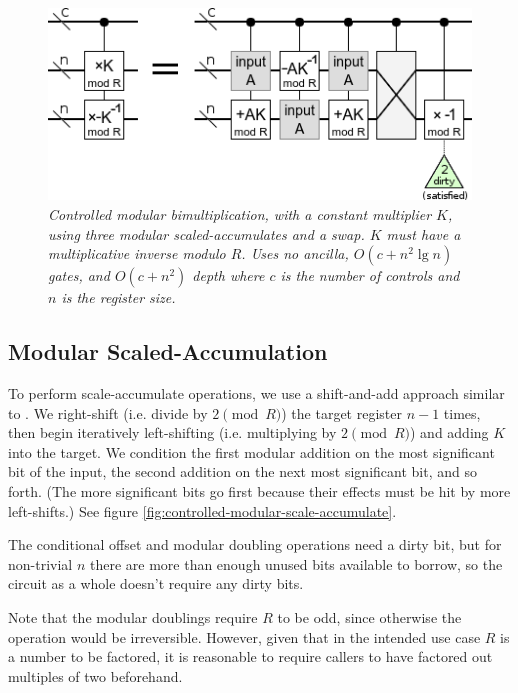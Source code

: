 \documentclass[twocolumn]{article}
\begin{document}
\begin{figure}
  \centering
  \includegraphics[width=\linewidth]{assets/controlled-modular-multiply.png}
  \caption{\em
    Controlled modular bimultiplication, with a constant multiplier $K$, using three modular scaled-accumulates and a swap.
    $K$ must have a multiplicative inverse modulo $R$.
    Uses no ancilla, $O(c + n^2 \lg n)$ gates, and $O(c + n^2)$ depth where $c$ is the number of controls and $n$ is the register size.
  }
  \label{fig:controlled-modular-multiply}
\end{figure}


\subsection{Modular Scaled-Accumulation}

To perform scale-accumulate operations, we use a shift-and-add approach similar to \cite{beauregard2003}.
We right-shift (i.e. divide by $2 {\pmod R}$) the target register $n-1$ times, then begin iteratively left-shifting (i.e. multiplying by $2 {\pmod R}$) and adding $K$ into the target.
We condition the first modular addition on the most significant bit of the input, the second addition on the next most significant bit, and so forth.
(The more significant bits go first because their effects must be hit by more left-shifts.)
See figure \ref{fig:controlled-modular-scale-accumulate}.

The conditional offset and modular doubling operations need a dirty bit, but for non-trivial $n$ there are more than enough unused bits available to borrow, so the circuit as a whole doesn't require any dirty bits.

Note that the modular doublings require $R$ to be odd, since otherwise the operation would be irreversible.
However, given that in the intended use case $R$ is a number to be factored, it is reasonable to require callers to have factored out multiples of two beforehand.
\end{document}
